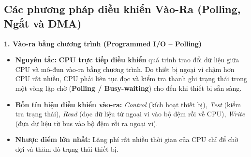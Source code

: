 \subsection{Các phương pháp điều khiển Vào-Ra (Polling, Ngắt và DMA)}

\textbf{1. Vào-ra bằng chương trình (Programmed I/O -- Polling)}
\begin{itemize}
    \item \textbf{Nguyên tắc:} \textbf{CPU trực tiếp điều khiển} quá trình trao đổi dữ liệu giữa CPU và mô-đun vào-ra bằng chương trình. Do thiết bị ngoại vi chậm hơn CPU rất nhiều, CPU phải liên tục đọc và kiểm tra thanh ghi trạng thái trong một vòng lặp chờ (\textbf{Polling / Busy-waiting}) cho đến khi thiết bị sẵn sàng.
    \item \textbf{Bốn tín hiệu điều khiển vào-ra:} \textit{Control} (kích hoạt thiết bị), \textit{Test} (kiểm tra trạng thái), \textit{Read} (đọc dữ liệu từ ngoại vi vào bộ đệm rồi về CPU), \textit{Write} (đưa dữ liệu từ bus vào bộ đệm rồi ra ngoại vi).
    \item \textbf{Nhược điểm lớn nhất:} Lãng phí rất nhiều thời gian của CPU chỉ để chờ đợi và thăm dò trạng thái thiết bị.
\end{itemize}

